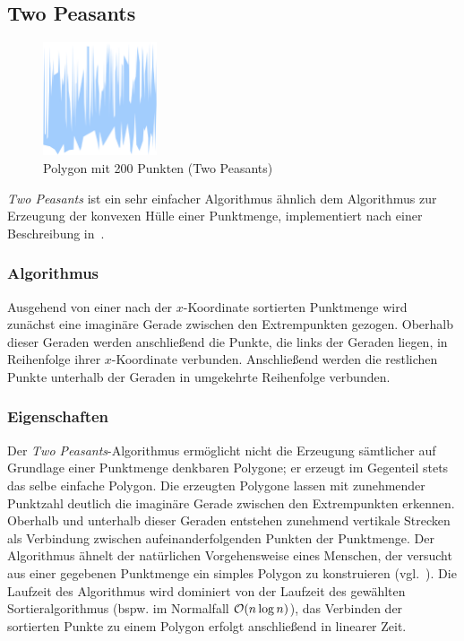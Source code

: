 \subsection{Two Peasants}

  \begin{figure}[h]
    \begin{center}
      \includegraphics[width=0.3\textwidth]{img/twopeasants200.eps}
    \end{center}
    \caption{Polygon mit 200 Punkten (Two Peasants)}
    \label{fig:twopeasants200}
  \end{figure}

  \emph{Two Peasants} ist ein sehr einfacher Algorithmus ähnlich dem Algorithmus
  zur Erzeugung der konvexen Hülle einer Punktmenge, implementiert nach einer
  Beschreibung in~\cite{geometrylab}.

  \subsubsection{Algorithmus}

    Ausgehend von einer nach der $x$-Koordinate sortierten Punktmenge wird
    zunächst eine imaginäre Gerade zwischen den Extrempunkten gezogen.
    Oberhalb dieser Geraden werden anschließend die Punkte, die links der
    Geraden liegen, in Reihenfolge ihrer $x$-Koordinate verbunden.
    Anschließend werden die restlichen Punkte unterhalb der Geraden in
    umgekehrte Reihenfolge verbunden.

  \subsubsection{Eigenschaften}

  Der \emph{Two Peasants}-Algorithmus ermöglicht nicht die Erzeugung sämtlicher
  auf Grundlage einer Punktmenge denkbaren Polygone; er erzeugt im Gegenteil
  stets das selbe einfache Polygon. Die erzeugten Polygone lassen mit
  zunehmender Punktzahl deutlich die imaginäre Gerade zwischen den Extrempunkten
  erkennen. Oberhalb und unterhalb dieser Geraden entstehen zunehmend vertikale
  Strecken als Verbindung zwischen aufeinanderfolgenden Punkten der Punktmenge.
  Der Algorithmus ähnelt der natürlichen Vorgehensweise eines Menschen, der
  versucht aus einer gegebenen Punktmenge ein simples Polygon zu konstruieren
  (vgl.~\cite{geometrylab}). Die Laufzeit des Algorithmus wird dominiert von der
  Laufzeit des gewählten Sortieralgorithmus (bspw. im Normalfall $\mathcal{O}(n \log
  n)$), das Verbinden der sortierten Punkte zu einem Polygon erfolgt
  anschließend in linearer Zeit.

